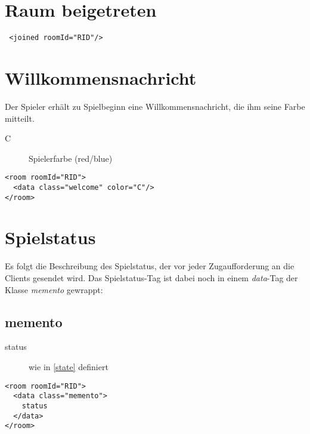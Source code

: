 \documentclass[12pt,a4paper, ngerman, oneside]{scrartcl}
\begin{document}
\section{Raum beigetreten}
 \begin{verbatim}
 <joined roomId="RID"/>
 \end{verbatim}

\section{Willkommensnachricht}
Der Spieler erhält zu Spielbeginn eine Willkommensnachricht, die ihm seine Farbe mitteilt.
\begin{description}
\item[C] Spielerfarbe (red/blue)
\end{description}
\begin{verbatim}
<room roomId="RID">
  <data class="welcome" color="C"/>
</room>
\end{verbatim}

\section{Spielstatus}
Es folgt die Beschreibung des Spielstatus, der vor jeder Zugaufforderung an die Clients gesendet wird. Das Spielstatus-Tag ist dabei noch in einem \textit{data}-Tag der Klasse \textit{memento} gewrappt:
\subsection{memento}
\begin{description}
\item[status] wie in \ref{state} definiert
\end{description}
\begin{verbatim}
<room roomId="RID"> 
  <data class="memento"> 
  	status
  </data> 
</room>
\end{verbatim}
\end{document}
